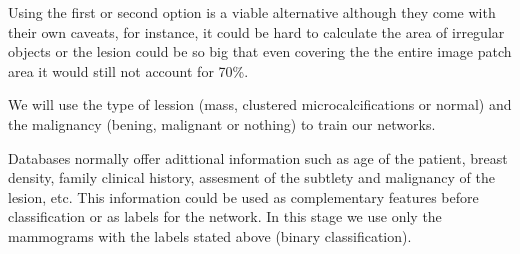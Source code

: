 Using the first or second option is a viable alternative although they come with their own caveats, for instance, it could be hard to calculate the area of irregular objects or the lesion could be so big that even covering the the entire image patch area it would still not account for 70\%.

We will use the type of lession (mass, clustered microcalcifications or normal) and the malignancy (bening, malignant or nothing) to train our networks.

Databases normally offer adittional information such as age of the patient, breast density, family clinical history, assesment of the subtlety and malignancy of the lesion, etc. This information could be used as complementary features before classification or as labels for the network. In this stage we use only the mammograms with the labels stated above (binary classification).



